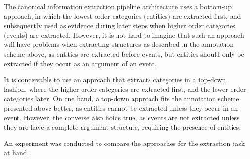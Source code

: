 The canonical information extraction pipeline architecture uses a bottom-up approach, in which the lowest order categories (entities) are extracted first, and subsequently used as evidence during later steps when higher order categories (events) are extracted. However, it is not hard to imagine that such an approach will have problems when extracting structures as described in the annotation scheme above, as entities are extracted before events, but entities should only be extracted if they occur as an argument of an event. 

It is conceivable to use an approach that extracts categories in a top-down fashion, where the higher order categories are extracted first, and the lower order categories later. On one hand, a top-down approach fits the annotation scheme presented above better, as entities cannot be extracted unless they occur in an event. However, the converse also holds true, as events are not extracted unless they are have a complete argument structure, requiring the presence of entities. 

An experiment was conducted to compare the approaches for the extraction task at hand.
